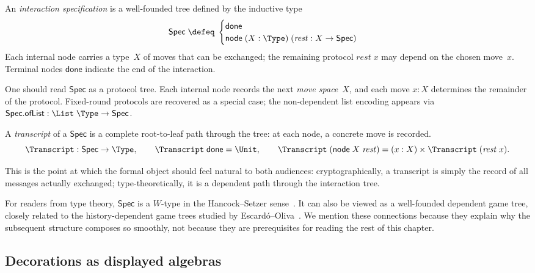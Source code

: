 \begin{definition}
  \label{int:spec}
  An \emph{interaction specification} is a well-founded tree defined by the
  inductive type
  \[
    \mathsf{Spec} \;\defeq\;
    \begin{cases}
      \mathsf{done} \\
      \mathsf{node}\;(X : \Type)\;(\mathit{rest} : X \to \mathsf{Spec})
    \end{cases}
  \]
  Each internal node carries a type~$X$ of moves that can be exchanged;
  the remaining protocol $\mathit{rest}\;x$ may depend on the chosen
  move~$x$.  Terminal nodes $\mathsf{done}$ indicate the end of the
  interaction.
\end{definition}

One should read $\mathsf{Spec}$ as a protocol tree.  Each internal node records
the next \emph{move space}~$X$, and each move $x : X$ determines the remainder
of the protocol.  Fixed-round protocols are recovered as a special case; the
non-dependent list encoding appears via
$\mathsf{Spec.ofList} : \List\;\Type \to \mathsf{Spec}$.

\begin{definition}[Transcript]
  \label{int:transcript}
  A \emph{transcript} of a $\mathsf{Spec}$ is a complete root-to-leaf path
  through the tree: at each node, a concrete move is recorded.
  \[
    \Transcript : \mathsf{Spec} \to \Type, \qquad
    \Transcript\;\mathsf{done} = \Unit, \qquad
    \Transcript\;(\mathsf{node}\;X\;\mathit{rest}) =
      (x : X) \times \Transcript\;(\mathit{rest}\;x).
  \]
\end{definition}

This is the point at which the formal object should feel natural to both
audiences: cryptographically, a transcript is simply the record of all messages
actually exchanged; type-theoretically, it is a dependent path through the
interaction tree.

For readers from type theory, $\mathsf{Spec}$ is a $W$-type in the
Hancock--Setzer sense~\cite{HancockSetzer2000}.  It can also be viewed as a
well-founded dependent game tree, closely related to the history-dependent game
trees studied by Escard\'o--Oliva~\cite{EscardoOliva2023}.  We mention these
connections because they explain why the subsequent structure composes so
smoothly, not because they are prerequisites for reading the rest of this
chapter.

\subsection{Decorations as displayed algebras}

